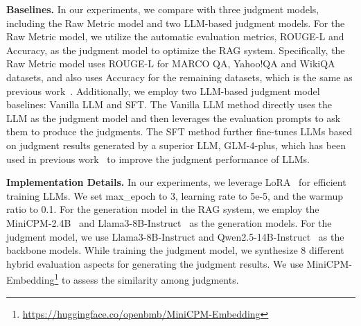 \textbf{Baselines.} In our experiments, we compare \method{} with three judgment models, including the Raw Metric model and two LLM-based judgment models. For the Raw Metric model, we utilize the automatic evaluation metrics, ROUGE-L and Accuracy, as the judgment model to optimize the RAG system. Specifically, the Raw Metric model uses ROUGE-L for MARCO QA, Yahoo!QA and WikiQA datasets, and also uses Accuracy for the remaining datasets, which is the same as previous work~\cite{rag-ddr2024Li}. Additionally, we employ two LLM-based judgment model baselines: Vanilla LLM and SFT. The Vanilla LLM method directly uses the LLM as the judgment model and then leverages the evaluation prompts to ask them to produce the judgments. The SFT method further fine-tunes LLMs based on judgment results generated by a superior LLM, GLM-4-plus, which has been used in previous work~\cite{zhang2025rag} to improve the judgment performance of LLMs.



\textbf{Implementation Details.} In our experiments, we leverage LoRA~\citep{hulora} for efficient training LLMs. We set max\_epoch to 3, learning rate to 5e-5, and the warmup ratio to 0.1. For the generation model in the RAG system, we employ the MiniCPM-2.4B~\cite{minicpm-2b2024Hu} and Llama3-8B-Instruct~\cite{touvron2023llama} as the generation models. For the judgment model, we use Llama3-8B-Instruct and Qwen2.5-14B-Instruct~\cite{qwen2.5-14b2023Bai} as the backbone models. While training the judgment model, we synthesize 8 different hybrid evaluation aspects for generating the judgment results. We use MiniCPM-Embedding\footnote{\url{https://huggingface.co/openbmb/MiniCPM-Embedding}} to assess the similarity among judgments.  








